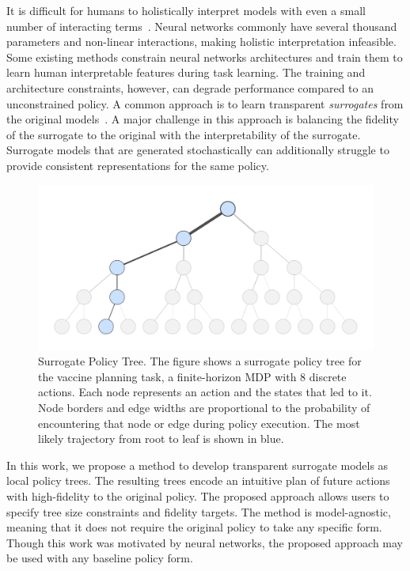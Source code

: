 \documentclass[letterpaper]{article} %
\begin{document}
It is difficult for humans to holistically interpret models with even a small number of interacting terms~\cite{lipton2018}.
Neural networks commonly have several thousand parameters and non-linear interactions, making holistic interpretation infeasible.
Some existing methods constrain neural networks architectures and train them to learn human interpretable features during task learning. %
The training and architecture constraints, however, can degrade performance compared to an unconstrained policy.
A common approach is to learn transparent \emph{surrogates} from the original models~\cite{adadi2018}.
A major challenge in this approach is balancing the fidelity of the surrogate to the original with the interpretability of the surrogate.
Surrogate models that are generated stochastically can additionally struggle to provide consistent representations for the same policy.

\begin{figure}[t]
    \centering
    \includegraphics[width=0.99\columnwidth]{figs/vaccine_graph_nodesonly.pdf}
    \caption{Surrogate Policy Tree. The figure shows a surrogate policy tree for the vaccine planning task, a finite-horizon MDP with 8 discrete actions. Each node represents an action and the states that led to it. Node borders and edge widths are proportional to the probability of encountering that node or edge during policy execution. The most likely trajectory from root to leaf is shown in blue.}
    \label{fig: graph unlabeled}
\end{figure}

In this work, we propose a method to develop transparent surrogate models as local policy trees.
The resulting trees encode an intuitive plan of future actions with high-fidelity to the original policy.
The proposed approach allows users to specify tree size constraints and fidelity targets.
The method is model-agnostic, meaning that it does not require the original policy to take any specific form.
Though this work was motivated by neural networks, the proposed approach may be used
with any baseline policy form.
\end{document}

